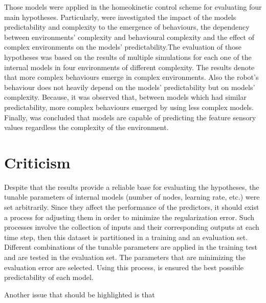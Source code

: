 \documentclass[msc,ai,logo]{infthesis}
\begin{document}
Those models were applied in the homeokinetic control scheme for evaluating four main hypotheses. Particularly, were investigated the impact of the models predictability and complexity to the emergence of behaviours, the dependency between environments' complexity and behavioural complexity and the effect of complex environments on the models' predictability.The evaluation of those hypotheses was based on the results of multiple simulations for each one of the internal models in four environments of different complexity. The results denote that more complex behaviours emerge in complex environments. Also the robot's behaviour does not heavily depend on the models' predictability but on models' complexity. Because, it was observed that, between models which had similar predictability, more complex behaviours emerged by using less complex models. Finally, was concluded that models are capable of predicting the feature sensory values regardless the complexity of the environment. 
\section*{Criticism}  
Despite that the results provide a reliable base for evaluating the hypotheses, the tunable parameters of internal models (number of nodes, learning rate, etc.) were set arbitrarily. Since they affect the performance of the predictors, it should exist a process for adjusting them in order to minimize the regularization error. Such processes involve the collection of inputs and their corresponding outputs at each time step, then this dataset is partitioned in a training and an evaluation set. Different combinations of the tunable parameters are applied in the training test and are tested in the evaluation set. The parameters that are minimizing the evaluation error are selected. Using this process, is ensured the best possible predictability of each model.

Another issue that should be highlighted is that      




% 

%






\end{document}
